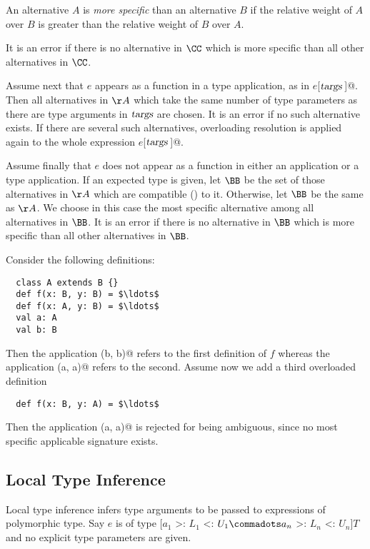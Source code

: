 An alternative $A$ is {\em more specific} than an alternative $B$ if
the relative weight of $A$ over $B$ is greater than the relative
weight of $B$ over $A$.

It is an error if there is no alternative in $\CC$ which is more
specific than all other alternatives in $\CC$.

Assume next that $e$ appears as a function in a type application, as
in \lstinline@$e$[$\mbox{\sl targs}\,$]@. Then all alternatives in
$\AA$ which take the same number of type parameters as there are type
arguments in $\mbox{\sl targs}$ are chosen. It is an error if no such alternative exists.
If there are several such alternatives, overloading resolution is
applied again to the whole expression \lstinline@$e$[$\mbox{\sl targs}\,$]@.  

Assume finally that $e$ does not appear as a function in either
an application or a type application. If an expected type is given,
let $\BB$ be the set of those alternatives in $\AA$ which are
compatible () to it. Otherwise, let $\BB$ be the same as $\AA$.
We choose in this case the most specific alternative among all
alternatives in $\BB$. It is an error if there is no 
alternative in $\BB$ which is more specific than all other
alternatives in $\BB$.

\example Consider the following definitions:

\begin{lstlisting}
  class A extends B {}
  def f(x: B, y: B) = $\ldots$
  def f(x: A, y: B) = $\ldots$
  val a: A 
  val b: B
\end{lstlisting}
Then the application \lstinline@f(b, b)@ refers to the first
definition of $f$ whereas the application \lstinline@f(a, a)@
refers to the second.  Assume now we add a third overloaded definition
\begin{lstlisting}
  def f(x: B, y: A) = $\ldots$
\end{lstlisting}
Then the application \lstinline@f(a, a)@ is rejected for being ambiguous, since
no most specific applicable signature exists.

\subsection{Local Type Inference}
\label{sec:local-type-inf}

Local type inference infers type arguments to be passed to expressions
of polymorphic type. Say $e$ is of type [$a_1$ >: $L_1$ <: $U_1
\commadots a_n$ >: $L_n$ <: $U_n$]$T$ and no explicit type parameters
are given. 


